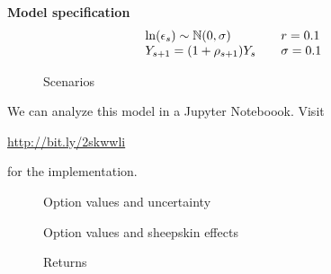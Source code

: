 \begin{frame}\textbf{Model specification}
\begin{align*}\begin{array}{l@{\qquad}l}
\ln(\epsilon_s) \sim \N(0, \sigma) & r = 0.1   \\
Y_{s + 1} = (1 + \rho_{s + 1}) Y_s & \sigma = 0.1 \\
\end{array}\end{align*}
\end{frame}
\begin{frame}
\begin{figure}[htp]\centering
\caption{Scenarios}
\end{figure}
\end{frame}
\begin{frame}
We can analyze this model in a Jupyter Noteboook. Visit
\begin{center}
\url{http://bit.ly/2skwwli}
\end{center}
for the implementation.
\end{frame}
\begin{frame}
\begin{figure}[htp]\centering
\caption{Option values and uncertainty}
\end{figure}
\end{frame}
\begin{frame}
\begin{figure}[htp]\centering
\caption{Option values and sheepskin effects}
\end{figure}
\end{frame}
\begin{frame}
\begin{figure}[htp]\centering
\caption{Returns}
\end{figure}
\end{frame}

